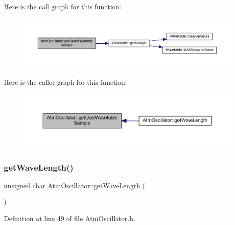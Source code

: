 Here is the call graph for this function\+:
\nopagebreak
\begin{figure}[H]
\begin{center}
\leavevmode
\includegraphics[width=350pt]{d8/d5f/class_atm_oscillator_ae5ef1556ef77dbf9ecceb5b64a1ad7e8_cgraph}
\end{center}
\end{figure}
Here is the caller graph for this function\+:
\nopagebreak
\begin{figure}[H]
\begin{center}
\leavevmode
\includegraphics[width=350pt]{d8/d5f/class_atm_oscillator_ae5ef1556ef77dbf9ecceb5b64a1ad7e8_icgraph}
\end{center}
\end{figure}
\mbox{\label{class_atm_oscillator_ad846116dfd6f232cae79ada35dddadfd}} 
\subsubsection{\texorpdfstring{get\+Wave\+Length()}{getWaveLength()}}
{\footnotesize\ttfamily unsigned char Atm\+Oscillator\+::get\+Wave\+Length (\begin{DoxyParamCaption}{ }\end{DoxyParamCaption})\hspace{0.3cm}{\ttfamily [inline]}}



Definition at line 49 of file Atm\+Oscillator.\+h.

